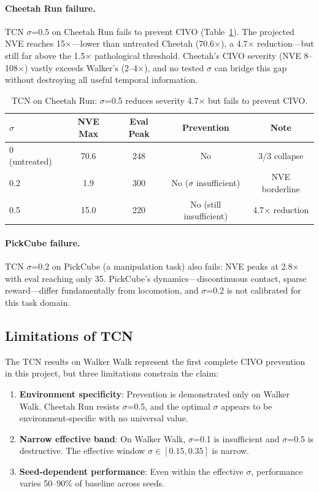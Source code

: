 \documentclass{article}
\begin{document}
\paragraph{Cheetah Run failure.}
TCN $\sigma$=0.5 on Cheetah Run fails to prevent CIVO (Table~\ref{tab:tcn-cheetah}).
The projected NVE reaches 15$\times$---lower than untreated Cheetah (70.6$\times$), a 4.7$\times$ reduction---but still far above the 1.5$\times$ pathological threshold.
Cheetah's CIVO severity (NVE 8--108$\times$) vastly exceeds Walker's (2--4$\times$), and no tested $\sigma$ can bridge this gap without destroying all useful temporal information.

\begin{table}[h]
\centering
\caption{TCN on Cheetah Run: $\sigma$=0.5 reduces severity 4.7$\times$ but fails to prevent CIVO.}
\label{tab:tcn-cheetah}
\begin{tabular}{lcccc}
\toprule
\textbf{$\sigma$} & \textbf{NVE Max} & \textbf{Eval Peak} & \textbf{Prevention} & \textbf{Note} \\
\midrule
0 (untreated) & 70.6 & 248 & No & 3/3 collapse \\
0.2 & 1.9 & 300 & No ($\sigma$ insufficient) & NVE borderline \\
0.5 & 15.0 & 220 & No (still insufficient) & 4.7$\times$ reduction \\
\bottomrule
\end{tabular}
\end{table}

\paragraph{PickCube failure.}
TCN $\sigma$=0.2 on PickCube (a manipulation task) also fails: NVE peaks at 2.8$\times$ with eval reaching only 35.
PickCube's dynamics---discontinuous contact, sparse reward---differ fundamentally from locomotion, and $\sigma$=0.2 is not calibrated for this task domain.

\subsection{Limitations of TCN}

The TCN results on Walker Walk represent the first complete CIVO prevention in this project, but three limitations constrain the claim:

\begin{enumerate}[leftmargin=*,itemsep=2pt]
\item \textbf{Environment specificity}: Prevention is demonstrated only on Walker Walk. Cheetah Run resists $\sigma$=0.5, and the optimal $\sigma$ appears to be environment-specific with no universal value.
\item \textbf{Narrow effective band}: On Walker Walk, $\sigma$=0.1 is insufficient and $\sigma$=0.5 is destructive. The effective window $\sigma \in [0.15, 0.35]$ is narrow.
\item \textbf{Seed-dependent performance}: Even within the effective $\sigma$, performance varies 50--90\% of baseline across seeds.
\end{enumerate}
\end{document}
